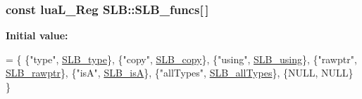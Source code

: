 \subsubsection[{\texorpdfstring{S\+L\+B\+\_\+funcs}{SLB_funcs}}]{\setlength{\rightskip}{0pt plus 5cm}const lua\+L\+\_\+\+Reg S\+L\+B\+::\+S\+L\+B\+\_\+funcs\mbox{[}$\,$\mbox{]}\hspace{0.3cm}{\ttfamily [static]}}\hypertarget{namespaceSLB_a24890659ebf4f33957ac8063262c08f5}{}\label{namespaceSLB_a24890659ebf4f33957ac8063262c08f5}
{\bfseries Initial value\+:}
\begin{DoxyCode}
= \{
    \{\textcolor{stringliteral}{"type"}, \hyperlink{namespaceSLB_afbfd289a5aadb332beb05a99118e1760}{SLB\_type}\},
    \{\textcolor{stringliteral}{"copy"}, \hyperlink{namespaceSLB_a2aab8e64bdc00b0c67be7b479b91ca8c}{SLB\_copy}\},
    \{\textcolor{stringliteral}{"using"}, \hyperlink{namespaceSLB_ac5fea559cc4c82ecb598bd043fabef2f}{SLB\_using}\},
    \{\textcolor{stringliteral}{"rawptr"}, \hyperlink{namespaceSLB_a7d63bcc58a8531a65fdf7ba41a8ef16b}{SLB\_rawptr}\},
    \{\textcolor{stringliteral}{"isA"}, \hyperlink{namespaceSLB_a4c3fea270a926c28617e37ad715e6f96}{SLB\_isA}\},
    \{\textcolor{stringliteral}{"allTypes"}, \hyperlink{namespaceSLB_a9c31adf36851032622757edc18f7e588}{SLB\_allTypes}\},
    \{NULL, NULL\}
  \}
\end{DoxyCode}
